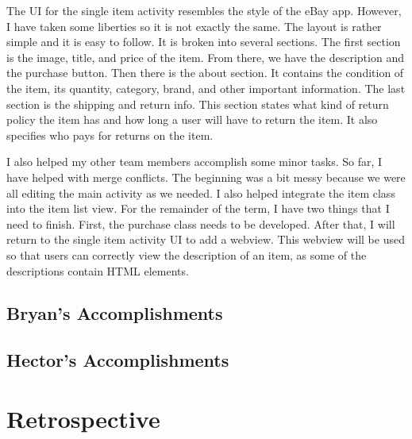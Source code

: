 \documentclass[journal,compsoc, 10pt, draftclsnofoot, onecolumn]{IEEEtran}
\begin{document}
The UI for the single item activity resembles the style of the eBay app. However, I 
have taken some liberties so it is not exactly the same. The layout is rather 
simple and it is easy to follow. It is broken into several sections. The first 
section is the image, title, and price of the item. From there, we have the 
description and the purchase button. Then there is the about section. It contains 
the condition of the item, its quantity, category, brand, and other important 
information. The last section is the shipping and return info. This section states 
what kind of return policy the item has and how long a user will have to return the 
item. It also specifies who pays for returns on the item.\newline

I also helped my other team members accomplish some minor tasks. So far, I have helped 
with merge conflicts. The beginning was a bit messy because we were all editing the 
main activity as we needed. I also helped integrate the item class into the item list 
view. For the remainder of the term, I have two things that I need to finish. First, 
the purchase class needs to be developed. After that, I will return to the single 
item activity UI to add a webview. This webview will be used so that users can 
correctly view the description of an item, as some of the descriptions contain HTML
elements. 

\subsection{Bryan's Accomplishments}

\subsection{Hector's Accomplishments}

\section{Retrospective}
\end{document}
